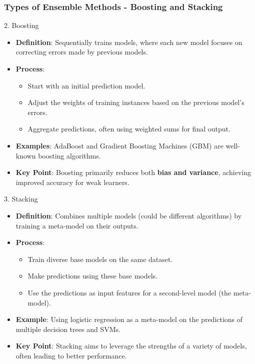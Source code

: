\documentclass[aspectratio=169]{beamer}
\begin{document}
\begin{frame}[fragile]
  \frametitle{Types of Ensemble Methods - Boosting and Stacking}
  \begin{block}{2. Boosting}
    \begin{itemize}
      \item \textbf{Definition}: Sequentially trains models, where each new model focuses on correcting errors made by previous models.
      \item \textbf{Process}:
        \begin{itemize}
          \item Start with an initial prediction model.
          \item Adjust the weights of training instances based on the previous model's errors.
          \item Aggregate predictions, often using weighted sums for final output.
        \end{itemize}
      \item \textbf{Examples}: AdaBoost and Gradient Boosting Machines (GBM) are well-known boosting algorithms.
      \item \textbf{Key Point}: Boosting primarily reduces both \textbf{bias and variance}, achieving improved accuracy for weak learners.
    \end{itemize}
  \end{block}

  \begin{block}{3. Stacking}
    \begin{itemize}
      \item \textbf{Definition}: Combines multiple models (could be different algorithms) by training a meta-model on their outputs.
      \item \textbf{Process}:
        \begin{itemize}
          \item Train diverse base models on the same dataset.
          \item Make predictions using these base models.
          \item Use the predictions as input features for a second-level model (the meta-model).
        \end{itemize}
      \item \textbf{Example}: Using logistic regression as a meta-model on the predictions of multiple decision trees and SVMs.
      \item \textbf{Key Point}: Stacking aims to leverage the strengths of a variety of models, often leading to better performance.
    \end{itemize}
  \end{block}
\end{frame}
\end{document}
